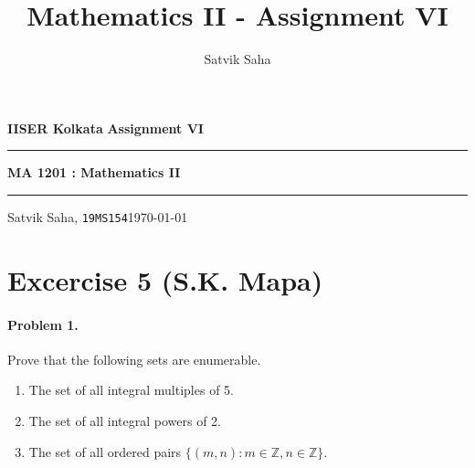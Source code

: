 \documentclass[10pt]{article}
\title{Mathematics II - Assignment VI}
\author{Satvik Saha}
\date{}
\begin{document}
        \par\textbf{IISER Kolkata} \hfill \textbf{Assignment VI}
        \vspace{3pt}
        \hrule
        \vspace{3pt}
        \begin{center}
                \LARGE{\textbf{MA 1201 : Mathematics II}}
        \end{center}
        \vspace{3pt}
        \hrule
        \vspace{3pt}
        Satvik Saha, \texttt{19MS154}\hfill\today
        \vspace{20pt}

        \section*{Excercise 5 (S.K. Mapa)}
        \paragraph{Problem 1.} Prove that the following sets are enumerable.
        \begin{enumerate}
                \item The set of all integral multiples of 5.
                \item The set of all integral powers of 2.
                \item The set of all ordered pairs $\{(m, n): m \in \mathbb{Z}, n \in \mathbb{Z}\}$.
        \end{enumerate}
\end{document}
